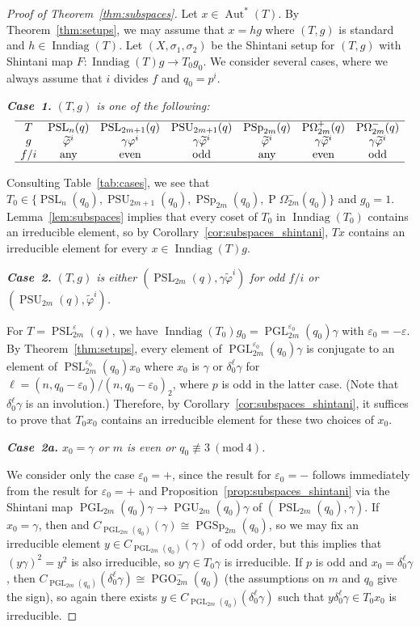 \documentclass[11pt]{article}
\numberwithin{equation}{section}
\theoremstyle{shdefinition}
\theoremstyle{shplain}
\newcommand{\g}{\gamma}
\renewcommand{\d}{\delta}
\newcommand{\e}{\varepsilon}
\newcommand{\p}{\varphi}
\renewcommand{\wp}{\widetilde{\varphi}}
\newcommand{\s}{\sigma}
\newcommand{\<}{\langle}
\renewcommand{\>}{\rangle}
\newcommand{\Aut}{\operatorname{Aut}}
\newcommand{\Inndiag}{\operatorname{Inndiag}}
\renewcommand{\:}{\colon}
\renewcommand{\mod}[1]{\mathrm{ \ } (\mathrm{mod\ } #1)}
\newcommand{\PSL}{\operatorname{PSL}}
\newcommand{\PGL}{\operatorname{PGL}}
\newcommand{\PSp}{\operatorname{PSp}}
\newcommand{\PGSp}{\operatorname{PGSp}}
\newcommand{\PSU}{\operatorname{PSU}}
\newcommand{\PGU}{\operatorname{PGU}}
\newcommand{\Om}{\Omega}
\newcommand{\POm}{\operatorname{P}\!\Om}
\newcommand{\PGO}{\operatorname{PGO}}
\begin{document}
\begin{proof}[Proof of Theorem~\ref{thm:subspaces}]
Let $x \in \Aut^*(T)$. By Theorem~\ref{thm:setups}, we may assume that $x=hg$ where $(T,g)$ is standard and $h \in \Inndiag(T)$. Let $(X,\s_1,\s_2)$ be the Shintani setup for $(T,g)$ with Shintani map $F\: \Inndiag(T)g \to T_0g_0$. We consider several cases, where we always assume that $i$ divides $f$ and $q_0=p^i$. \vspace{0.5\baselineskip}

\emph{\textbf{Case~1.} $(T,g)$ is one of the following:}\nopagebreak
\[
\begin{array}{ccccccc}
\hline
T   & \PSL_n(q)  & \PSL_{2m+1}(q) & \PSU_{2m+1}(q) & \PSp_{2m}(q) & \POm^+_{2m}(q) & \POm^-_{2m}(q) \\
g   & \wp^i      & \g\p^i         & \g\wp^i        & \wp^i        & \g\wp^i        & \g\wp^i        \\
f/i & \text{any} & \text{even}    & \text{odd}     & \text{any}   & \text{even}    & \text{odd}     \\
\hline
\end{array}
\]

Consulting Table~\ref{tab:cases}, we see that $T_0 \in \{ \PSL_n(q_0), \PSU_{2m+1}(q_0), \PSp_{2m}(q_0), \POm^-_{2m}(q_0) \}$ and $g_0=1$. Lemma~\ref{lem:subspaces} implies that every coset of $T_0$ in $\Inndiag(T_0)$ contains an irreducible element, so by Corollary~\ref{cor:subspaces_shintani}, $Tx$ contains an irreducible element for every $x \in \Inndiag(T)g$. \vspace{0.5\baselineskip}

\emph{\textbf{Case~2.} $(T,g)$ is either $(\PSL_{2m}(q), \g\wp^i)$ for odd $f/i$ or $(\PSU_{2m}(q),\wp^i)$.}\nopagebreak

For $T = \PSL^\e_{2m}(q)$, we have $\Inndiag(T_0)g_0 = \PGL^{\e_0}_{2m}(q_0)\g$ with $\e_0=-\e$. By Theorem~\ref{thm:setups}, every element of $\PGL^{\e_0}_{2m}(q_0)\g$ is conjugate to an element of $\PSL^{\e_0}_{2m}(q_0)x_0$ where $x_0$ is $\g$ or $\d_0^\ell\g$ for $\ell=(n,q_0-\e_0)/(n,q_0-\e_0)_2$, where $p$ is odd in the latter case. (Note that $\d_0^\ell\g$ is an involution.) Therefore, by Corollary~\ref{cor:subspaces_shintani}, it suffices to prove that $T_0x_0$ contains an irreducible element for these two choices of $x_0$.

\emph{\textbf{Case~2a.} $x_0 = \g$ or $m$ is even or $q_0 \not\equiv 3 \mod{4}$.}\nopagebreak

We consider only the case $\e_0=+$, since the result for $\e_0=-$ follows immediately from the result for $\e_0=+$ and Proposition~\ref{prop:subspaces_shintani} via the Shintani map $\PGL_{2m}(q_0)\g \to \PGU_{2m}(q_0)\g$ of $(\PSL_{2m}(q_0),\g)$. If $x_0 = \g$, then and $C_{\PGL_{2m}(q_0)}(\g) \cong \PGSp_{2m}(q_0)$, so we may fix an irreducible element $y \in C_{\PGL_{2m}(q_0)}(\g)$ of odd order, but this implies that $(y\g)^2 = y^2$ is also irreducible, so $y\g \in T_0\g$ is irreducible. If $p$ is odd and $x_0=\d_0^\ell\g$, then $C_{\PGL_{2m}(q_0)}(\d_0^\ell\g) \cong \PGO^-_{2m}(q_0)$ (the assumptions on $m$ and $q_0$ give the sign), so again there exists $y \in C_{\PGL_{2m}(q_0)}(\d_0^\ell\g)$ such that $y\d_0^\ell\g \in T_0x_0$ is irreducible.


\end{proof}
\end{document}

